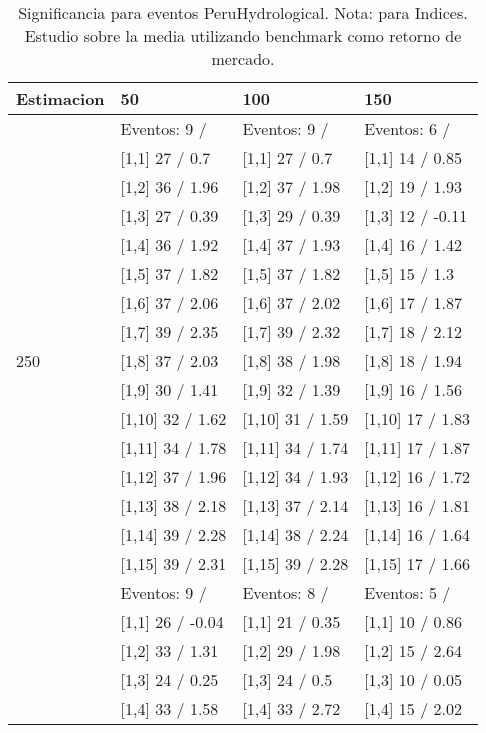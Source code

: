\begin{table}

\caption{Significancia para eventos PeruHydrological. Nota: para Indices. Estudio sobre la media utilizando benchmark como retorno de mercado.}
\centering
\begin{tabular}[t]{llll}
\toprule
Estimacion & 50 & 100 & 150\\
\midrule
 & Eventos:  9 / & Eventos:  9 / & Eventos:  6 /\\
 & {}[1,1] 27  / 0.7 & {}[1,1] 27  / 0.7 & {}[1,1] 14  / 0.85\\
 & {}[1,2] 36  / 1.96 & {}[1,2] 37  / 1.98 & {}[1,2] 19  / 1.93\\
 & {}[1,3] 27  / 0.39 & {}[1,3] 29  / 0.39 & {}[1,3] 12  / -0.11\\
 & {}[1,4] 36  / 1.92 & {}[1,4] 37  / 1.93 & {}[1,4] 16  / 1.42\\
\addlinespace
 & {}[1,5] 37  / 1.82 & {}[1,5] 37  / 1.82 & {}[1,5] 15  / 1.3\\
 & {}[1,6] 37  / 2.06 & {}[1,6] 37  / 2.02 & {}[1,6] 17  / 1.87\\
 & {}[1,7] 39  / 2.35 & {}[1,7] 39  / 2.32 & {}[1,7] 18  / 2.12\\
250 & {}[1,8] 37  / 2.03 & {}[1,8] 38  / 1.98 & {}[1,8] 18  / 1.94\\
 & {}[1,9] 30  / 1.41 & {}[1,9] 32  / 1.39 & {}[1,9] 16  / 1.56\\
\addlinespace
 & {}[1,10] 32  / 1.62 & {}[1,10] 31  / 1.59 & {}[1,10] 17  / 1.83\\
 & {}[1,11] 34  / 1.78 & {}[1,11] 34  / 1.74 & {}[1,11] 17  / 1.87\\
 & {}[1,12] 37  / 1.96 & {}[1,12] 34  / 1.93 & {}[1,12] 16  / 1.72\\
 & {}[1,13] 38  / 2.18 & {}[1,13] 37  / 2.14 & {}[1,13] 16  / 1.81\\
 & {}[1,14] 39  / 2.28 & {}[1,14] 38  / 2.24 & {}[1,14] 16  / 1.64\\
\addlinespace
 & {}[1,15] 39  / 2.31 & {}[1,15] 39  / 2.28 & {}[1,15] 17  / 1.66\\
 & Eventos:  9 / & Eventos:  8 / & Eventos:  5 /\\
 & {}[1,1] 26  / -0.04 & {}[1,1] 21  / 0.35 & {}[1,1] 10  / 0.86\\
 & {}[1,2] 33  / 1.31 & {}[1,2] 29  / 1.98 & {}[1,2] 15  / 2.64\\
 & {}[1,3] 24  / 0.25 & {}[1,3] 24  / 0.5 & {}[1,3] 10  / 0.05\\
\addlinespace
 & {}[1,4] 33  / 1.58 & {}[1,4] 33  / 2.72 & {}[1,4] 15  / 2.02\\

\end{tabular}
\end{table}
